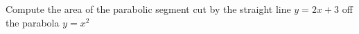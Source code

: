 
%
%
%
%
% 
% 

\question[3] Compute the area of the parabolic segment cut by the straight line 
$y=2x + 3$ off the parabola $y=x^2$


